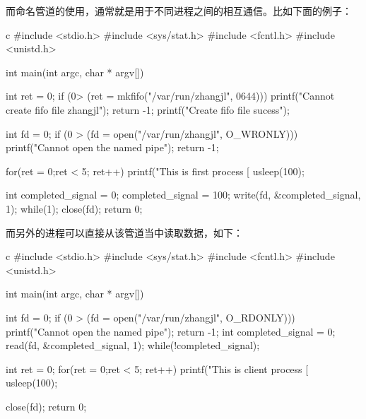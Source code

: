 而命名管道的使用，通常就是用于不同进程之间的相互通信。比如下面的例子：
\begin{code-block}{c}
#include <stdio.h>
#include <sys/stat.h>
#include <fcntl.h>
#include <unistd.h>

int main(int argc, char * argv[])
{
        int ret = 0;
        if (0> (ret = mkfifo("/var/run/zhangjl", 0644)))
        {
                printf("Cannot create fifo file zhangjl\n");
                return -1;
        }
        printf("Create fifo file sucess\n");

        int fd = 0;
        if (0 > (fd = open("/var/run/zhangjl", O_WRONLY)))
        {
                printf("Cannot open the named pipe\n");
                return -1;
        }

        for(ret = 0;ret < 5; ret++)
        {
                printf("This is first process [%
                usleep(100);
        }

        int completed_signal = 0;
        completed_signal = 100;
        write(fd, &completed_signal, 1);
        while(1);
        close(fd);
        return 0;
}
\end{code-block}

而另外的进程可以直接从该管道当中读取数据，如下：
\begin{code-block}{c}
#include <stdio.h>
#include <sys/stat.h>
#include <fcntl.h>
#include <unistd.h>

int main(int argc, char * argv[])
{
        int fd = 0;
        if (0 > (fd = open("/var/run/zhangjl", O_RDONLY)))
        {
                printf("Cannot open the named pipe\n");
                return -1;
        }
        int completed_signal = 0;
        read(fd, &completed_signal, 1);
        while(!completed_signal);

        int ret = 0;
        for(ret = 0;ret < 5; ret++)
        {
                printf("This is client process [%
                usleep(100);
        }

        close(fd);
        return 0;
}
\end{code-block}

